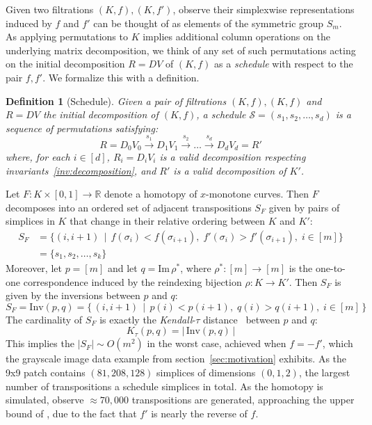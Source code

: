 \documentclass[sn-mathphys]{sn-jnl}
\newtheorem{definition}{Definition}
\begin{document}
Given two filtrations $(K,f), (K,f')$, observe their simplexwise representations induced by $f$ and $f'$ can be thought of as elements of the symmetric group $S_m$.
As applying permutations to $K$ implies additional column operations on the underlying matrix decomposition, we think of any set of such permutations acting on the initial decomposition $R=DV$ of $(K,f)$ as a \emph{schedule} with respect to the pair $f,f'$. We formalize this with a definition.
\begin{definition}[Schedule]\label{def:schedule}
Given a pair of filtrations $(K, f), (K,f)$ 
and $R = DV$ the initial decomposition of $(K, f)$, a \emph{schedule}  $\mathcal{S} = (s_1, s_2, \dots, s_d )$ is a sequence of permutations  satisfying: 
	\begin{equation}\label{eq:rv_seq_schedule}
   		R = D_0 V_0 \overset{s_1}{\to} D_1 V_{1} \overset{s_2}{\to} \dots \overset{s_d}{\to} D_d V_{d} = R'
   	\end{equation}
   	where, for each $i \in [d]$, $R_i = D_i V_i$ is a valid decomposition respecting invariants~\ref{inv:decomposition}, and $R'$ is a valid decomposition of $K'$.
\end{definition}
\noindent Let $F : K \times [0,1] \to \mathbb{R}$ denote a homotopy of $x$-monotone curves. Then  $F$ decomposes into an ordered set of adjacent transpositions $S_F$ given by pairs of simplices in $K$ that change in their relative ordering between $K$ and $K'$:
\begin{align*}\label{eq:sf_schedule}
	S_F &= \{ (i,i+1) \, \mid \, f(\sigma_i) < f(\sigma_{i+1}), \;  f'(\sigma_i) > f'(\sigma_{i+1}), \; i \in [m] \} \\
	&= \{ s_1, s_2, \dots, s_k \} 
\end{align*}
Moreover, let $p = [m]$ and let $q = \mathrm{Im}\,\rho^\ast$, where $\rho^\ast : [m] \to [m]$ is the one-to-one correspondence induced by the reindexing bijection $\rho: K \to K'$. Then $S_F$ is given by the inversions between $p$ and $q$:
\[S_F = 
\mathrm{Inv}(p, q) = \{ \, (i,i+1) \, \mid \, p(i) < p(i+1), \; q(i) > q(i+1), \; i \in [m]\, \}
\]
The cardinality of $  S_F $ is exactly the \emph{Kendall}-$\tau$ distance~\cite{diaconis1977spearman} between $p$ and $q$: 
\begin{equation}\label{eq:kendall_dist}
	K_\tau(p, q) = \lvert \, \mathrm{Inv}(p, q) \, \rvert
\end{equation}
This implies the $\lvert S_F \rvert \sim O(m^2)$ in the worst case, achieved when $f = - f'$, which the grayscale image data example from section~\ref{sec:motivation} exhibits. 
As the 9x9 patch contains $(81, 208, 128)$ simplices of dimensions $(0, 1, 2)$, the largest number of transpositions a schedule simplices in total. As the homotopy is simulated, observe $\approx 70,\!000$ transpositions are generated, approaching the upper bound of , due to the fact that $f'$  is nearly the reverse of $f$.   
\end{document}
